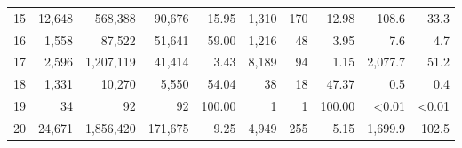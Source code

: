 \begin{table}
\begin{center}
{\begin{tabular}{crrrrrrrrr}
\multicolumn{1}{c}{15} & 12,648 & 568,388 & 90,676 & 15.95 & 1,310 & 170 & 12.98 & 108.6 & 33.3 \\
\multicolumn{1}{c}{16} & 1,558 & 87,522 & 51,641 & 59.00 & 1,216 & 48 & 3.95 & 7.6 & 4.7 \\
\multicolumn{1}{c}{17} & 2,596 & 1,207,119 & 41,414 & 3.43 & 8,189 & 94 & 1.15 & 2,077.7 & 51.2 \\
\multicolumn{1}{c}{18} & 1,331 & 10,270 & 5,550 & 54.04  & 38 & 18 & 47.37 & 0.5 & 0.4 \\
\multicolumn{1}{c}{19} & 34 & 92 & 92 & 100.00 & 1 & 1 & 100.00 & <0.01 & <0.01 \\
\multicolumn{1}{c}{20} & 24,671 & 1,856,420 & 171,675 &  9.25 & 4,949 & 255 & 5.15 & 1,699.9 & 102.5  \\
\hline
\end{tabular} 
}
\end{center}
\end{table}

